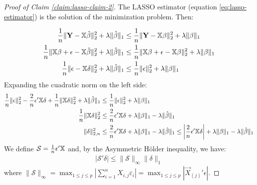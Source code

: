 \begin{proof}[Proof of Claim \ref{claim:lasso-claim-2}]
\label{proof:claim-lasso-claim-2}
The LASSO estimator (equation \ref{eq:lasso-estimator}) is the solution of the minimization problem. Then:

\begin{align*}
    \dfrac{1}{n} \|\mathbf{Y} - \mathbb{X} \hat{\beta}\|_{2}^{2} +
    \lambda \|\hat{\beta}\|_{1} 
    &\leq
    \dfrac{1}{n} \|\mathbf{Y} - \mathbb{X} \beta\|_{2}^{2} +
    \lambda \|\beta\|_{1}\\
    \dfrac{1}{n} \|\mathbb{X}\beta + \epsilon - \mathbb{X} \hat{\beta}\|_{2}^{2} +
    \lambda \|\hat{\beta}\|_{1} 
    &\leq
    \dfrac{1}{n} \|\mathbb{X}\beta + \epsilon - \mathbb{X} \beta\|_{2}^{2} +
    \lambda \|\beta\|_{1}\\
    \dfrac{1}{n} \|\epsilon - \mathbb{X} \delta \|_{2}^{2} +
    \lambda \|\hat{\beta}\|_{1} 
    &\leq
    \dfrac{1}{n} \|\epsilon\|_{2}^{2} +
    \lambda \|\beta\|_{1}
\end{align*}
Expanding the cuadratic norm on the left side:
\begin{align*}
    \dfrac{1}{n} \|\epsilon\|_{2}^{2} - 
    \dfrac{2}{n} \epsilon' \mathbb{X} \delta +
    \dfrac{1}{n} \|\mathbb{X} \delta\|_{2}^{2} +
    \lambda \|\hat{\beta}\|_{1} 
    &\leq
    \dfrac{1}{n} \|\epsilon\|_{2}^{2} +
    \lambda \|\beta\|_{1}\\
    \dfrac{1}{n} \|\mathbb{X} \delta\|_{2}^{2}
    &\leq
    \dfrac{2}{n} \epsilon' \mathbb{X} \delta +
    \lambda \|\beta\|_{1} -
    \lambda \|\hat{\beta}\|_{1}\\
    \|\delta\|_{2, n}^{2}
    &\leq
    \dfrac{2}{n} \epsilon' \mathbb{X} \delta +
    \lambda \|\beta\|_{1} -
    \lambda \|\hat{\beta}\|_{1}
    \leq
    \left|\dfrac{2}{n} \epsilon' \mathbb{X} \delta\right| +
    \lambda \|\beta\|_{1} -
    \lambda \|\hat{\beta}\|_{1}
\end{align*} 
We define $\mathcal{S} = \frac{1}{n} \epsilon'\mathbb{X}$ and, by the Asymmetric H\"older inequality, we have:
\begin{align*}
    |\mathcal{S}' \delta| \leq \|\mathcal{S}\|_{\infty} \|\delta\|_{1}
\end{align*}
where $\|\mathcal{S}\|_{\infty} = \max_{1 \leq j \leq p} \left| \sum_{i=1}^{n} X_{i,j} \varepsilon_i \right| = \max_{1 \leq j \leq p} \left| \Vec{X}_{(j)}' \epsilon \right|$.


\end{proof}
